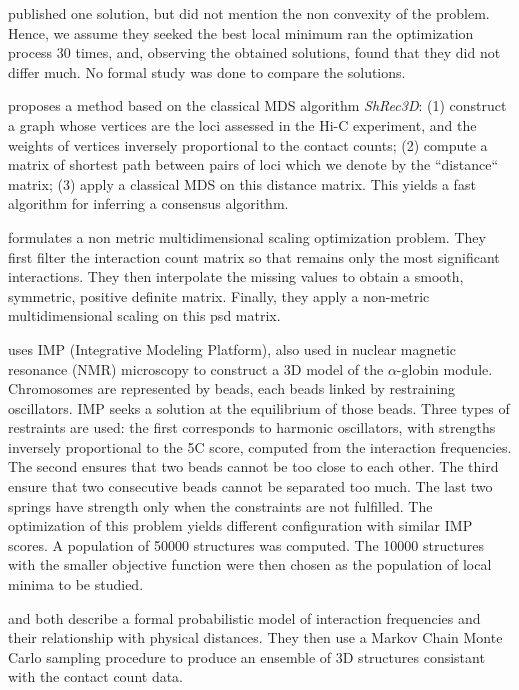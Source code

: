 \citet{tanizawa:mapping} published one solution, but did not mention the non
convexity of the problem. Hence, we assume they seeked the best local minimum
\citet{duan:three} ran the optimization process 30 times, and, observing the
obtained solutions, found that they did not differ much. No formal study was
done to compare the solutions.

\citet{lesne:3d} proposes a method based on the classical MDS algorithm
\textit{ShRec3D}:
(1) construct a graph whose vertices are the loci assessed in the Hi-C
experiment, and the weights of vertices inversely proportional to the contact
counts; (2) compute a matrix of shortest path between pairs of loci which we
denote by the ``distance`` matrix; (3) apply a classical MDS on this distance
matrix. This yields a fast algorithm for inferring a consensus algorithm.

\citet{ben-elazar:spatial} formulates a non metric multidimensional scaling
optimization problem. They first filter the interaction count matrix so that
remains only the most significant interactions. They then interpolate the
missing values to obtain a smooth, symmetric, positive definite matrix.
Finally, they apply a non-metric multidimensional scaling on this psd
matrix.

\citet{bau:three-dimensional} uses IMP (Integrative Modeling Platform), also
used in nuclear magnetic resonance (NMR) microscopy to construct a 3D model of
the $\alpha$-globin module. Chromosomes are represented by beads, each beads
linked by restraining oscillators. IMP seeks a solution at the equilibrium of
those beads. Three types of restraints are used: the first  corresponds to
harmonic oscillators, with strengths inversely proportional to the 5C
score, computed from the interaction frequencies. The second ensures that two
beads cannot be too close to each other. The third ensure that two consecutive
beads cannot be separated too much. The last two springs have strength only
when the constraints are not fulfilled. The optimization of this problem
yields different configuration with similar IMP scores. A population of 50000
structures was computed. The 10000 structures with the smaller objective
function were then chosen as the population of local minima to be studied.

\citet{rousseau:three} and \citet{hu:bayesian} both describe a formal
probabilistic model of interaction frequencies and their relationship with
physical distances. They then use a Markov Chain Monte Carlo sampling
procedure to produce an ensemble of 3D structures consistant with the contact
count data.

